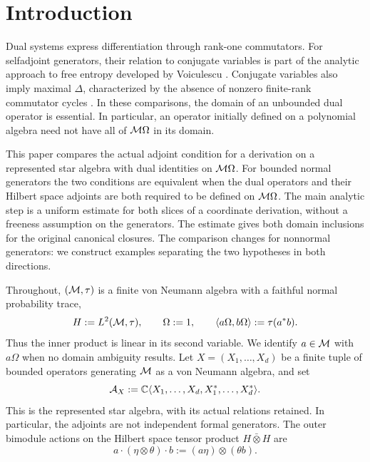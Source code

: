 \section{Introduction}
Dual systems express differentiation through rank-one commutators.
For selfadjoint generators, their relation to conjugate variables is part of the analytic approach to free entropy developed by Voiculescu \cite{Voi98}.
Conjugate variables also imply maximal $\Delta$, characterized by the absence of nonzero finite-rank commutator cycles \cite{ACSY24,MSY23}.
In these comparisons, the domain of an unbounded dual operator is essential.
In particular, an operator initially defined on a polynomial algebra need not have all of $\mathcal M\Omega$ in its domain.

This paper compares the actual adjoint condition for a derivation on a represented star algebra with dual identities on $\mathcal M\Omega$.
For bounded normal generators the two conditions are equivalent when the dual operators and their Hilbert space adjoints are both required to be defined on $\mathcal M\Omega$.
The main analytic step is a uniform estimate for both slices of a coordinate derivation, without a freeness assumption on the generators.
The estimate gives both domain inclusions for the original canonical closures.
The comparison changes for nonnormal generators: we construct examples separating the two hypotheses in both directions.

Throughout, $(\mathcal M,\tau)$ is a finite von Neumann algebra with a faithful normal probability trace,
\[
 H:=L^2(\mathcal M,\tau),\qquad \Omega:=1,\qquad
 \langle a\Omega,b\Omega\rangle:=\tau(a^*b).
\]
Thus the inner product is linear in its second variable.
We identify $a\in\mathcal M$ with $a\Omega$ when no domain ambiguity results.
Let $X=(X_1,\ldots,X_d)$ be a finite tuple of bounded operators generating $\mathcal M$ as a von Neumann algebra, and set
\[
 \mathcal A_X:=\mathbb C\langle X_1,\ldots,X_d,X_1^*,\ldots,X_d^*\rangle.
\]
This is the represented star algebra, with its actual relations retained.
In particular, the adjoints are not independent formal generators.
The outer bimodule actions on the Hilbert space tensor product $H\bar\otimes H$ are
\[
 a\cdot(\eta\otimes\theta)\cdot b:=(a\eta)\otimes(\theta b).
\]

